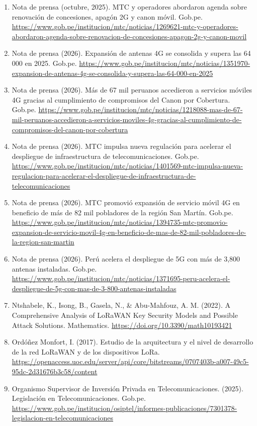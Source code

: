 \documentclass[12pt,a4paper]{article}
\begin{document}
\begin{enumerate}
    \item Nota de prensa (octubre, 2025). MTC y operadores abordaron agenda sobre renovación de concesiones, apagón 2G y canon móvil. Gob.pe. \url{https://www.gob.pe/institucion/mtc/noticias/1269621-mtc-y-operadores-abordaron-agenda-sobre-renovacion-de-concesiones-apagon-2g-y-canon-movil}
    \item Nota de prensa (2026). Expansión de antenas 4G se consolida y supera las 64 000 en 2025. Gob.pe. \url{https://www.gob.pe/institucion/mtc/noticias/1351970-expansion-de-antenas-4g-se-consolida-y-supera-las-64-000-en-2025}
    \item Nota de prensa (2026). Más de 67 mil peruanos accedieron a servicios móviles 4G gracias al cumplimiento de compromisos del Canon por Cobertura. Gob.pe. \url{https://www.gob.pe/institucion/mtc/noticias/1218088-mas-de-67-mil-peruanos-accedieron-a-servicios-moviles-4g-gracias-al-cumplimiento-de-compromisos-del-canon-por-cobertura}
    \item Nota de prensa (2026). MTC impulsa nueva regulación para acelerar el despliegue de infraestructura de telecomunicaciones. Gob.pe. \url{https://www.gob.pe/institucion/mtc/noticias/1401569-mtc-impulsa-nueva-regulacion-para-acelerar-el-despliegue-de-infraestructura-de-telecomunicaciones}
    \item Nota de prensa (2026). MTC promovió expansión de servicio móvil 4G en beneficio de más de 82 mil pobladores de la región San Martín. Gob.pe. \url{https://www.gob.pe/institucion/mtc/noticias/1394735-mtc-promovio-expansion-de-servicio-movil-4g-en-beneficio-de-mas-de-82-mil-pobladores-de-la-region-san-martin}
    \item Nota de prensa (2026). Perú acelera el despliegue de 5G con más de 3,800 antenas instaladas. Gob.pe. \url{https://www.gob.pe/institucion/mtc/noticias/1371695-peru-acelera-el-despliegue-de-5g-con-mas-de-3-800-antenas-instaladas}
    \item Ntshabele, K., Isong, B., Gasela, N., \& Abu-Mahfouz, A. M. (2022). A Comprehensive Analysis of LoRaWAN Key Security Models and Possible Attack Solutions. Mathematics. \url{https://doi.org/10.3390/math10193421}
    \item Ordóñez Monfort, I. (2017). Estudio de la arquitectura y el nivel de desarrollo de la red LoRaWAN y de los dispositivos LoRa. \url{https://openaccess.uoc.edu/server/api/core/bitstreams/0707403b-a007-49c5-95dc-2d31676b3c58/content}
    \item Organismo Supervisor de Inversión Privada en Telecomunicaciones. (2025). Legislación en Telecomunicaciones. Gob.pe. \url{https://www.gob.pe/institucion/osiptel/informes-publicaciones/7301378-legislacion-en-telecomunicaciones}

\end{enumerate}
\end{document}
